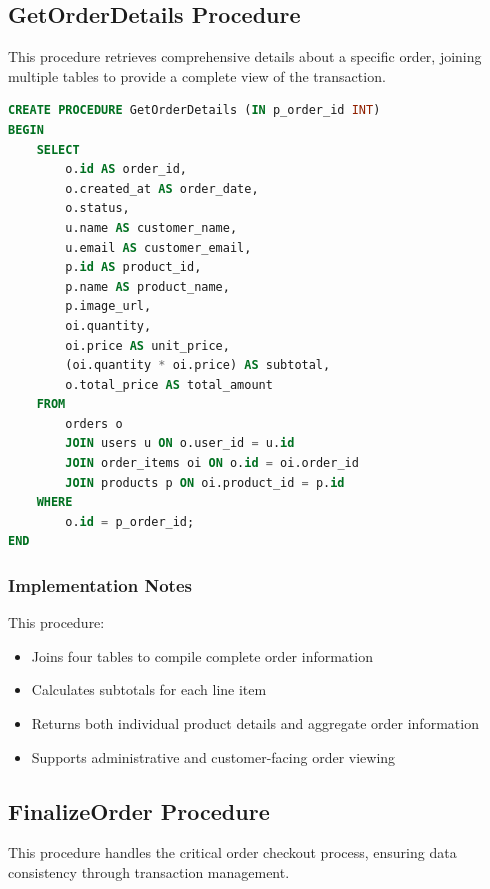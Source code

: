\documentclass[13pt,a4paper]{article}
\begin{document}
\subsection{GetOrderDetails Procedure}
This procedure retrieves comprehensive details about a specific order, joining multiple tables to provide a complete view of the transaction.

\begin{lstlisting}[language=SQL]
CREATE PROCEDURE GetOrderDetails (IN p_order_id INT)
BEGIN
    SELECT
        o.id AS order_id,
        o.created_at AS order_date,
        o.status,
        u.name AS customer_name,
        u.email AS customer_email,
        p.id AS product_id,
        p.name AS product_name,
        p.image_url,
        oi.quantity,
        oi.price AS unit_price,
        (oi.quantity * oi.price) AS subtotal,
        o.total_price AS total_amount
    FROM
        orders o
        JOIN users u ON o.user_id = u.id
        JOIN order_items oi ON o.id = oi.order_id
        JOIN products p ON oi.product_id = p.id
    WHERE
        o.id = p_order_id;
END
\end{lstlisting}

\subsubsection{Implementation Notes}
This procedure:
\begin{itemize}
	\item Joins four tables to compile complete order information
	\item Calculates subtotals for each line item
	\item Returns both individual product details and aggregate order information
	\item Supports administrative and customer-facing order viewing
\end{itemize}

\subsection{FinalizeOrder Procedure}
This procedure handles the critical order checkout process, ensuring data consistency through transaction management.
\end{document}
